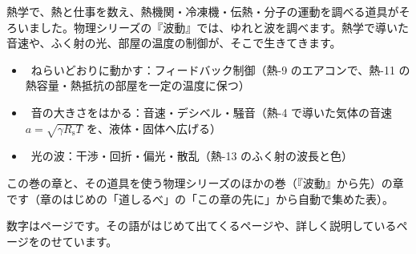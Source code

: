 \newcommand\bknextpill[1]{\bk@pill{#1}}
{\small 熱学で、熱と仕事を数え、熱機関・冷凍機・伝熱・分子の運動を調べる道具がそろいました。物理シリーズの『波動』では、ゆれと波を調べます。熱学で導いた音速や、ふく射の光、部屋の温度の制御が、そこで生きてきます。\par}\vspace{3mm}
\begin{tcolorbox}[enhanced, colframe=phVol3, colback=white, boxrule=0.9pt, arc=2.5mm, left=3mm, right=3mm, top=2mm, bottom=2mm,
  title={物理シリーズの『波動』：ゆれと波を読む}, fonttitle=\sffamily\bfseries, colbacktitle=phVol3, coltitle=white]
\small
\begin{itemize}[leftmargin=1.2\zw, itemsep=2pt, topsep=1pt, label={\color{phVol3}●}]
\item {}\ ねらいどおりに動かす：フィードバック制御（熱-9 のエアコンで、熱-11 の熱容量・熱抵抗の部屋を一定の温度に保つ）
\item {}\ 音の大きさをはかる：音速・デシベル・騒音（熱-4 で導いた気体の音速 $a=\sqrt{\gamma R_{\mathrm s}T}$ を、液体・固体へ広げる）
\item {}\ 光の波：干渉・回折・偏光・散乱（熱-13 のふく射の波長と色）
\end{itemize}
\end{tcolorbox}
{\small この巻の章と、その道具を使う物理シリーズのほかの巻（『波動』から先）の章です（章のはじめの「道しるべ」の「この章の先に」から自動で集めた表）。\par}\vspace{2mm}


{\small 数字はページです。その語がはじめて出てくるページや、詳しく説明しているページをのせています。}\par\vspace{2mm}
\raggedcolumns\begin{multicols}{2}\small\setlength{\parskip}{0pt}
\end{multicols}

